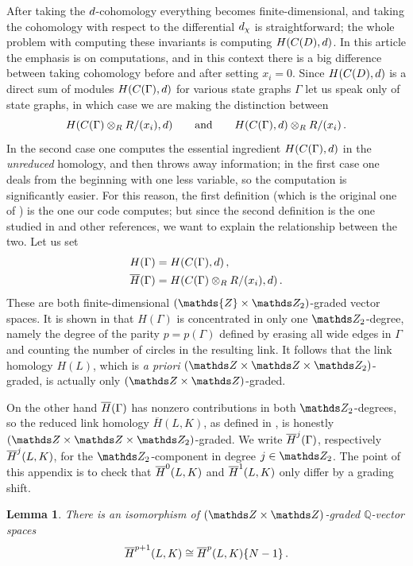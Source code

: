 \documentclass{compositio}
\newtheorem{lemma}[theorem]{Lemma}
\theoremstyle{definition}
\numberwithin{equation}{section}
\begin{document}
After taking the $d$-cohomology everything becomes finite-dimensional, and taking the cohomology with respect to the differential $d_{\chi}$ is straightforward; the whole problem with computing these invariants is computing $H(C(D), d)$. In this article the emphasis is on computations, and in this context there is a big difference between taking cohomology before and after setting $x_i = 0$. Since $H(C(D), d)$ is a direct sum of modules $H(C(\Gamma), d)$ for various state graphs $\Gamma$ let us speak only of state graphs, in which case we are making the distinction between
\[
H(C(\Gamma) \otimes_R R/(x_i), d ) \qquad \text{and} \qquad H( C(\Gamma), d ) \otimes_R R/(x_i) \, .
\]
In the second case one computes the essential ingredient $H( C(\Gamma), d )$ in the \emph{unreduced} homology, and then throws away information; in the first case one deals from the beginning with one less variable, so the computation is significantly easier. For this reason, the first definition (which is the original one of \cite{kr0401268}) is the one our code computes; but since the second definition is the one studied in \cite{r0607544} and other references, we want to explain the relationship between the two. Let us set
\begin{align*}
H(\Gamma) &= H( C(\Gamma), d ) \, ,\\
\overline{H}(\Gamma) &= H( C(\Gamma) \otimes_R R/(x_i), d ) \, .
\end{align*}
These are both finite-dimensional $(\mathds{Z} \times \Ztwo)$-graded vector spaces. It is shown in \cite{kr0401268} that $H(\Gamma)$ is concentrated in only one $\Ztwo$-degree, namely the degree of the parity $p = p(\Gamma)$ defined by erasing all wide edges in $\Gamma$ and counting the number of circles in the resulting link. It follows that the link homology $H(L)$, which is \emph{a priori} $(\ZZ \times \ZZ \times \Ztwo)$-graded, is actually only $(\ZZ \times \ZZ)$-graded.

On the other hand $\overline{H}(\Gamma)$ has nonzero contributions in both $\Ztwo$-degrees, so the reduced link homology $\overline{H}(L,K)$, as defined in \cite{kr0401268}, is honestly $(\ZZ \times \ZZ \times \Ztwo)$-graded. We write $\overline{H}^j(\Gamma)$, respectively $\overline{H}^j(L,K)$, for the $\Ztwo$-component in degree $j \in \Ztwo$. The point of this appendix is to check that $\overline{H}^0(L,K)$ and $\overline{H}^1(L,K)$ only differ by a grading shift.

\begin{lemma}\label{lemma:redvsunred} There is an isomorphism of $(\ZZ \times \ZZ)$-graded $\mathds{Q}$-vector spaces 
\[
\overline{H}^{p+1}(L,K) \cong \overline{H}^{p}(L,K)\{N-1\} \, .
\]
\end{lemma}
\end{document}
